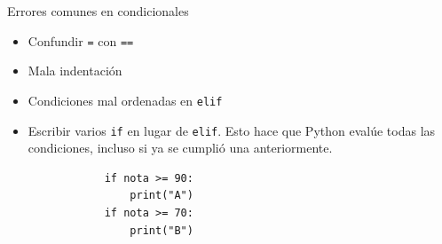 \documentclass{beamer}
\begin{document}


    \begin{frame}[fragile,t]{Errores comunes en condicionales}
        \begin{itemize}
            \item Confundir \texttt{=} con \texttt{==}
            \item Mala indentación
            \item Condiciones mal ordenadas en \texttt{elif}
            \item Escribir varios \texttt{if} en lugar de \texttt{elif}. Esto hace que Python
            evalúe todas las condiciones, incluso si ya se cumplió una anteriormente.
            \begin{verbatim}
            if nota >= 90:
                print("A")
            if nota >= 70:
                print("B")
            \end{verbatim}
        \end{itemize}
    \end{frame}
\end{document}
